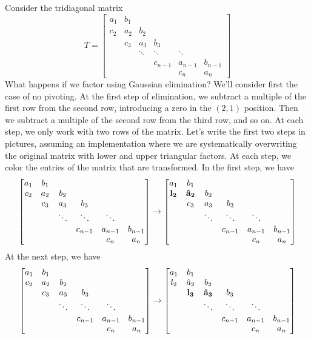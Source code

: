 \documentclass[12pt, leqno]{article}
\begin{document}
Consider the tridiagonal matrix
\[
T = \begin{bmatrix}
  a_1 & b_1 \\
  c_2 & a_2 & b_2 \\
      & c_3 & a_3 & b_3 \\
      &     & \ddots & \ddots & \ddots \\
      &     &        & c_{n-1} & a_{n-1} & b_{n-1} \\
      &     &        &        & c_n     & a_n
  \end{bmatrix}
\]
What happens if we factor using Gaussian elimination?  We'll consider
first the case of no pivoting.  At the first step of elimination,
we subtract a multiple of the first row from the second row,
introducing a zero in the $(2,1)$ position.  Then we subtract a
multiple of the second row from the third row, and so on.
At each step, we only work with two rows of the matrix.  Let's write
the first two steps in pictures, assuming an implementation where
we are systematically overwriting the original matrix with lower
and upper triangular factors.  At each step, we color the entries
of the matrix that are transformed.  In the first step, we have
\[
  \begin{bmatrix}
  a_1 & b_1 \\
  c_2 & a_2 & b_2 \\
      & c_3 & a_3 & b_3 \\
      &     & \ddots & \ddots & \ddots \\
      &     &        & c_{n-1} & a_{n-1} & b_{n-1} \\
      &     &        &        & c_n     & a_n
  \end{bmatrix} \rightarrow
  \begin{bmatrix}
  a_1 & b_1 \\
  {\bf l_2} & {\bf \hat{a}_2} & b_2 \\
      & c_3 & a_3 & b_3 \\
      &     & \ddots & \ddots & \ddots \\
      &     &        & c_{n-1} & a_{n-1} & b_{n-1} \\
      &     &        &        & c_n     & a_n
  \end{bmatrix}
\]
At the next step, we have
\[
  \begin{bmatrix}
  a_1 & b_1 \\
  c_2 & a_2 & b_2 \\
      & c_3 & a_3 & b_3 \\
      &     & \ddots & \ddots & \ddots \\
      &     &        & c_{n-1} & a_{n-1} & b_{n-1} \\
      &     &        &        & c_n     & a_n
  \end{bmatrix} \rightarrow
  \begin{bmatrix}
  a_1 & b_1 \\
  l_2 & \hat{a}_2 & b_2 \\
      & {\bf l_3} & {\bf \hat{a}_3} & b_3 \\
      &     & \ddots & \ddots & \ddots \\
      &     &        & c_{n-1} & a_{n-1} & b_{n-1} \\
      &     &        &        & c_n     & a_n
  \end{bmatrix}
\]
\end{document}
